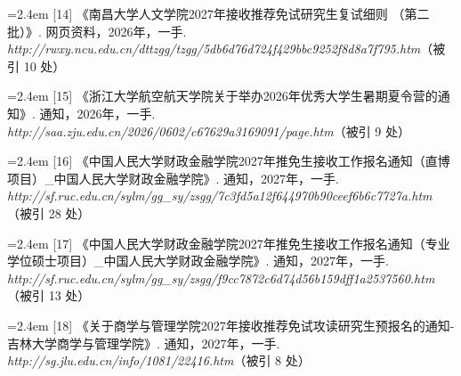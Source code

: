 {\vspace{0.6pt}
\vspace{3.5pt}\par
\nopagebreak\vspace{1pt}
\noindent\hangindent=2.4em \label{src:S0016}{\color{cAccent}[14]} 《南昌大学人文学院2027年接收推荐免试研究生复试细则 （第二批）》. 网页资料，2026年，一手. \textit{http://rwxy.ncu.edu.cn/dttzgg/tzgg/5db6d76d724f429bbc9252f8d8a7f795.htm}（被引 10 处）\par
\vspace{0.6pt}
\vspace{3.5pt}\par
\nopagebreak\vspace{1pt}
\noindent\hangindent=2.4em \label{src:S0017}{\color{cAccent}[15]} 《浙江大学航空航天学院关于举办2026年优秀大学生暑期夏令营的通知》. 通知，2026年，一手. \textit{http://saa.zju.edu.cn/2026/0602/c67629a3169091/page.htm}（被引 9 处）\par
\vspace{0.6pt}
\vspace{3.5pt}\par
\nopagebreak\vspace{1pt}
\noindent\hangindent=2.4em \label{src:S0018}{\color{cAccent}[16]} 《中国人民大学财政金融学院2027年推免生接收工作报名通知（直博项目）\_中国人民大学财政金融学院》. 通知，2027年，一手. \textit{http://sf.ruc.edu.cn/sylm/gg\_sy/zsgg/7c3fd5a12f644970b90ceef6b6c7727a.htm}（被引 28 处）\par
\vspace{0.6pt}
\noindent\hangindent=2.4em \label{src:S0019}{\color{cAccent}[17]} 《中国人民大学财政金融学院2027年推免生接收工作报名通知（专业学位硕士项目）\_中国人民大学财政金融学院》. 通知，2027年，一手. \textit{http://sf.ruc.edu.cn/sylm/gg\_sy/zsgg/f9cc7872c6d74d56b159dff1a2537560.htm}（被引 13 处）\par
\vspace{0.6pt}
\vspace{3.5pt}\par
\nopagebreak\vspace{1pt}
\noindent\hangindent=2.4em \label{src:S0020}{\color{cAccent}[18]} 《关于商学与管理学院2027年接收推荐免试攻读研究生预报名的通知-吉林大学商学与管理学院》. 通知，2027年，一手. \textit{http://sg.jlu.edu.cn/info/1081/22416.htm}（被引 8 处）\par
}
